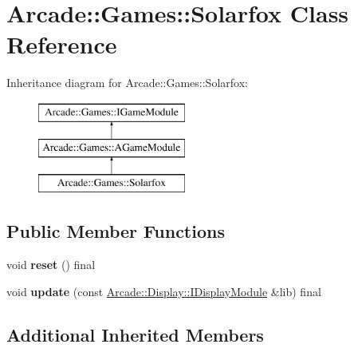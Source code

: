 \hypertarget{classArcade_1_1Games_1_1Solarfox}{}\section{Arcade\+::Games\+::Solarfox Class Reference}
\label{classArcade_1_1Games_1_1Solarfox}
Inheritance diagram for Arcade\+::Games\+::Solarfox\+:\begin{figure}[H]
\begin{center}
\leavevmode
\includegraphics[height=3.000000cm]{classArcade_1_1Games_1_1Solarfox}
\end{center}
\end{figure}
\subsection*{Public Member Functions}
\begin{DoxyCompactItemize}
\item 
\mbox{\label{classArcade_1_1Games_1_1Solarfox_abd44684c20c1590db929f494a55d5576}} 
void {\bfseries reset} () final
\item 
\mbox{\label{classArcade_1_1Games_1_1Solarfox_a87d7898dc7b5d8c658a18c45d35be991}} 
void {\bfseries update} (const \mbox{\hyperlink{classArcade_1_1Display_1_1IDisplayModule}{Arcade\+::\+Display\+::\+I\+Display\+Module}} \&lib) final
\end{DoxyCompactItemize}
\subsection*{Additional Inherited Members}
